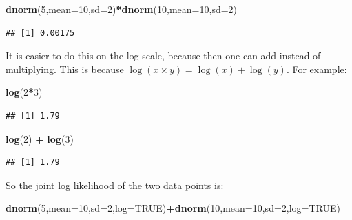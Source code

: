 \documentclass[12pt,]{krantz}
\newenvironment{Shaded}{\begin{snugshade}}{\end{snugshade}}
\newcommand{\KeywordTok}[1]{\textcolor[rgb]{0.13,0.29,0.53}{\textbf{#1}}}
\newcommand{\DataTypeTok}[1]{\textcolor[rgb]{0.13,0.29,0.53}{#1}}
\newcommand{\DecValTok}[1]{\textcolor[rgb]{0.00,0.00,0.81}{#1}}
\newcommand{\StringTok}[1]{\textcolor[rgb]{0.31,0.60,0.02}{#1}}
\newcommand{\OtherTok}[1]{\textcolor[rgb]{0.56,0.35,0.01}{#1}}
\newcommand{\OperatorTok}[1]{\textcolor[rgb]{0.81,0.36,0.00}{\textbf{#1}}}
\newcommand{\NormalTok}[1]{#1}
\theoremstyle{definition}
\theoremstyle{definition}
\theoremstyle{definition}
\theoremstyle{remark}
\begin{document}
\begin{Shaded}
\begin{Highlighting}[]
\KeywordTok{dnorm}\NormalTok{(}\DecValTok{5}\NormalTok{,}\DataTypeTok{mean=}\DecValTok{10}\NormalTok{,}\DataTypeTok{sd=}\DecValTok{2}\NormalTok{)}\OperatorTok{*}\KeywordTok{dnorm}\NormalTok{(}\DecValTok{10}\NormalTok{,}\DataTypeTok{mean=}\DecValTok{10}\NormalTok{,}\DataTypeTok{sd=}\DecValTok{2}\NormalTok{)}
\end{Highlighting}
\end{Shaded}

\begin{verbatim}
## [1] 0.00175
\end{verbatim}

It is easier to do this on the log scale, because then one can add
instead of multiplying. This is because
\(\log(x\times y)= \log(x) + \log(y)\). For example:

\begin{Shaded}
\begin{Highlighting}[]
\KeywordTok{log}\NormalTok{(}\DecValTok{2}\OperatorTok{*}\DecValTok{3}\NormalTok{)}
\end{Highlighting}
\end{Shaded}

\begin{verbatim}
## [1] 1.79
\end{verbatim}

\begin{Shaded}
\begin{Highlighting}[]
\KeywordTok{log}\NormalTok{(}\DecValTok{2}\NormalTok{) }\OperatorTok{+}\StringTok{ }\KeywordTok{log}\NormalTok{(}\DecValTok{3}\NormalTok{)}
\end{Highlighting}
\end{Shaded}

\begin{verbatim}
## [1] 1.79
\end{verbatim}

So the joint log likelihood of the two data points is:

\begin{Shaded}
\begin{Highlighting}[]
\KeywordTok{dnorm}\NormalTok{(}\DecValTok{5}\NormalTok{,}\DataTypeTok{mean=}\DecValTok{10}\NormalTok{,}\DataTypeTok{sd=}\DecValTok{2}\NormalTok{,}\DataTypeTok{log=}\OtherTok{TRUE}\NormalTok{)}\OperatorTok{+}\KeywordTok{dnorm}\NormalTok{(}\DecValTok{10}\NormalTok{,}\DataTypeTok{mean=}\DecValTok{10}\NormalTok{,}\DataTypeTok{sd=}\DecValTok{2}\NormalTok{,}\DataTypeTok{log=}\OtherTok{TRUE}\NormalTok{)}
\end{Highlighting}
\end{Shaded}
\end{document}
